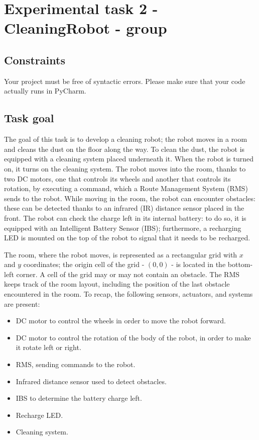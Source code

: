 \chapter{Experimental task 2 - CleaningRobot - \notdd group}
\section{Constraints}
Your project must be free of syntactic errors. Please make sure that your code actually runs in PyCharm.


\section{Task goal}
The goal of this task is to develop a cleaning robot; the robot moves in a room and cleans the dust on the floor along the way. To clean the dust, the robot is equipped with a cleaning system placed underneath it. When the robot is turned on, it turns on the cleaning system.
The robot moves into the room, thanks to two DC motors, one that controls its wheels and another that controls its rotation, by executing a command, which a Route Management System (RMS) sends to the robot. While moving in the room, the robot can encounter obstacles: these can be detected thanks to an infrared (IR) distance sensor placed in the front.
The robot can check the charge left in its internal battery: to do so, it is equipped with an Intelligent Battery Sensor (IBS); furthermore, a recharging LED is mounted on the top of the robot to signal that it needs to be recharged.

The room, where the robot moves, is represented as a rectangular grid with $x$ and $y$ coordinates; the origin cell of the grid - \ie $(0,0)$ - is located in the bottom-left corner. A cell of the grid may or may not contain an obstacle. The RMS keeps track of the room layout, including the position of the last obstacle encountered in the room.
To recap, the following sensors, actuators, and systems are present:

\begin{itemize}
    \item DC motor to control the wheels in order to move the robot forward.
    \item DC motor to control the rotation of the body of the robot, in order to make it rotate left or right.
    \item RMS, sending commands to the robot.
    \item Infrared distance sensor used to detect obstacles.
    \item IBS to determine the battery charge left.
    \item Recharge LED.
    \item Cleaning system.
\end{itemize}

